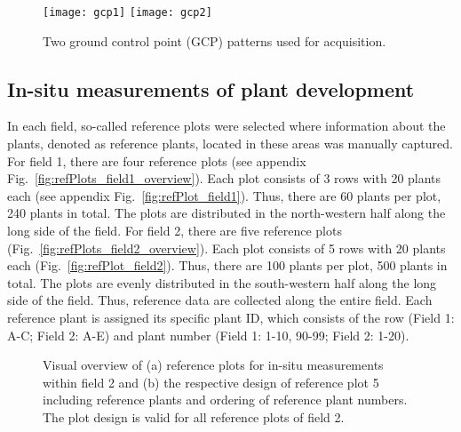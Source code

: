 \documentclass{article}
\def\figref#1{Fig.~\ref{#1}}
\begin{document}
\begin{figure}[t]
	\centering
    \texttt{[image: gcp1]}
    \hspace{10pt}
    \texttt{[image: gcp2]}
	\caption{Two ground control point (GCP) patterns used for acquisition.}
    \label{fig:gcp}
\end{figure}






\subsection{In-situ measurements of plant development}\label{sec:manualMeasurements}

In each field, so-called reference plots were selected where information about the plants, denoted as reference plants, located in these areas was manually captured.
For field 1, there are four reference plots (see appendix \figref{fig:refPlots_field1_overview}). Each plot consists of 3 rows with 20 plants each (see appendix \figref{fig:refPlot_field1}). Thus, there are 60 plants per plot, 240 plants in total. The plots are distributed in the north-western half along the long side of the field.
For field 2, there are five reference plots (\figref{fig:refPlots_field2_overview}). Each plot consists of 5 rows with 20 plants each (\figref{fig:refPlot_field2}). Thus, there are 100 plants per plot, 500 plants in total. The plots are evenly distributed in the south-western half along the long side of the field.
Thus, reference data are collected along the entire field. Each reference plant is assigned its specific plant ID, which consists of the row (Field 1: A-C; Field 2: A-E) and plant number
(Field 1: 1-10, 90-99; Field 2: 1-20).

\begin{figure}[t]
	\centering
    \hspace{10pt}
     
\caption{Visual overview of (a) reference plots for in-situ measurements within field 2
and (b) the respective design of reference plot 5 including reference plants and ordering of reference plant numbers. The plot design is valid for all reference plots of field 2.}
	\label{fig:refPlots_field2}
\end{figure}
\end{document}
